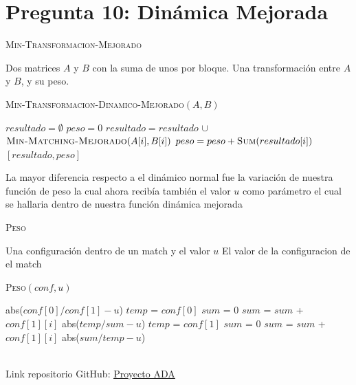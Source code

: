 \documentclass[conference]{IEEEtran}
\begin{document}
\section{Pregunta 10: Dinámica Mejorada}

\begin{algorithm}
\caption{\textsc{Min-Transformacion-Mejorado}}
\scriptsize
\begin{algorithmic}
\REQUIRE Dos matrices $A$ y $B$ con la suma de unos por bloque.
\ENSURE Una transformación entre $A$ y $B$, y su peso.
\begin{flushleft}
\textsc{Min-Transformacion-Dinamico-Mejorado}$(A,B)$
\end{flushleft}
    \STATE $resultado=\emptyset$
    \STATE $peso=0$
        \STATE $resultado=resultado$ $\cup$ $\textsc{Min-Matching-Mejorado}(A[i],B[i])$
    \ENDFOR
        \STATE $peso=peso+\textsc{Sum}(resultado[i])$
    \ENDFOR
    \RETURN $[resultado,peso]$
\end{algorithmic}
\label{alg:min-transformacion-dinamico-mejorado}
\end{algorithm}

La mayor diferencia respecto a el dinámico normal fue la variación de nuestra función de peso la cual ahora recibía también el valor $u$ como parámetro el cual se hallaria dentro de nuestra función dinámica mejorada
\begin{algorithm}
\caption{\textsc{Peso}}
\scriptsize
\begin{algorithmic}
\REQUIRE Una configuración dentro de un match y el valor $u$
\ENSURE El valor de la configuracion de el match
\begin{flushleft}
\textsc{Peso}$(conf, u)$
\end{flushleft}
        \RETURN abs($conf[0]/conf[1] - u$)
        \STATE $temp$ = $conf[0]$
        \STATE $sum$ = $0$
            \STATE $sum$ = $sum$ + $conf[1][i]$
        \ENDFOR
        \RETURN abs($temp/sum - u$)
    \ELSE
        \STATE $temp$ = $conf[1]$
        \STATE $sum$ = $0$
            \STATE $sum$ = $sum$ + $conf[1][i]$
        \ENDFOR
        \RETURN abs($sum/temp - u$)
    \ENDIF
\end{algorithmic}
\label{alg:min-transformacion-peso}
\end{algorithm}

\renewcommand{\appendixname}{Anexos}
\renewcommand{\appendixtocname}{Anexos}
\renewcommand{\appendixpagename}{Anexos}

\appendix
\verb||\\
Link repositorio GitHub: \href{https://github.com/Piero16301/Proyecto_ADA.git}{\underline{Proyecto ADA}}
\end{document}
